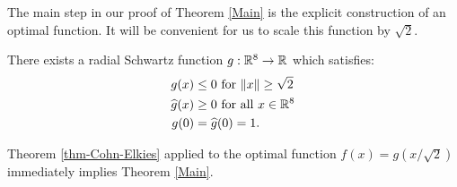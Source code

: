 The main step in our proof of Theorem \ref{Main} is the explicit  construction of an optimal function. It will be convenient for us to scale this function by $\sqrt{2}$.
\begin{theorem}\label{thm-g}
There exists a radial Schwartz function $g:\mathbb{R}^8\to\mathbb{R}$ which satisfies:
\begin{align}
g(x)&\leq 0\mbox{ for } \|x\|\geq \sqrt{2} \label{eqn-g1}\\
\widehat{g}(x)&\geq0\mbox{ for all } x\in\mathbb{R}^8\label{eqn-g2}\\
g(0)&=\widehat{g}(0)=1.\label{eqn-g3}
\end{align}
\end{theorem}
Theorem \ref{thm-Cohn-Elkies} applied to the optimal function $f(x)=g(x/\sqrt{2})$ immediately implies Theorem \ref{Main}.
